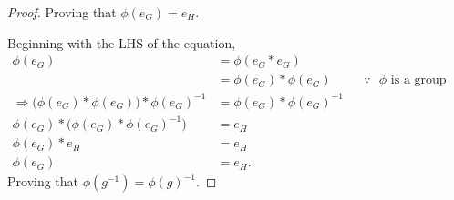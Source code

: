 \documentclass[
  coursecode={MTHE 418},
  assignmentname={Homework \homeworknumber},
  studentnumber=20053722,
  name={Bryan Hoang},
  draft,
]{
  ltxanswer%
}
\date{2022-02-28}
\begin{document}
  \begin{questions}
    \setcounter{question}{\questionnumber}
    \addtocounter{question}{-1}
    \question[10]\
    \begin{parts}
      \part{}
      \begin{solution}
        \begin{proof}
          \proofpart{} Proving that \(\phi(e_{G}) = e_{H}\).

          Beginning with the LHS of the equation,
          \begin{align*}
            \phi(e_{G})                                                            &= \phi(e_{G} * e_{G})                                                                \\
                                                                                   &= \phi(e_{G}) * \phi(e_{G})      & &\because\text{ \(\phi\) is a group homomorphism} \\
            \Rightarrow \Biggl(\phi(e_{G}) * \phi(e_{G})\Biggr) * \phi(e_{G})^{-1} &= \phi(e_{G}) * \phi(e_{G})^{-1}                                                     \\
            \phi(e_{G}) * \Biggl(\phi(e_{G}) * \phi(e_{G})^{-1}\Biggr)             &= e_{H}                                                                              \\
            \phi(e_{G}) * e_{H}                                                    &= e_{H}                                                                              \\
            \phi(e_{G})                                                            &= e_{H}.
          \end{align*}
          \proofpart{} Proving that \(\phi(g^{-1}) = \phi(g)^{-1}\).


\end{proof}
\end{solution}
\end{parts}
\end{questions}
\end{document}
